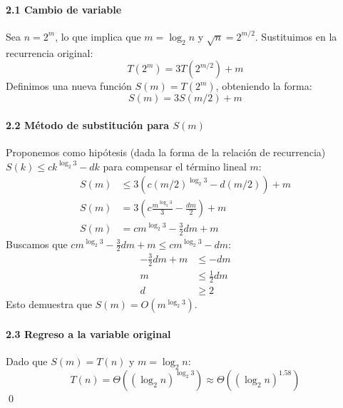 \documentclass{article}
\begin{document}
\begin{enumerate}
    \paragraph{2.1 Cambio de variable}
    Sea $n = 2^m$, lo que implica que $m = \log_2 n$ y $\sqrt{n} = 2^{m/2}$. Sustituimos en la recurrencia original:
    \[ T(2^m) = 3T(2^{m/2}) + m \]
    Definimos una nueva función $S(m) = T(2^m)$, obteniendo la forma:
    \[ S(m) = 3S(m/2) + m \]

    \paragraph{2.2 Método de substitución para $S(m)$}
    Proponemos como hipótesis (dada la forma de la relación de recurrencia) $S(k) \le ck^{\log_2 3} - dk$ para compensar el término lineal $m$:
    \begin{align*}
        S(m) &\le 3(c(m/2)^{\log_2 3} - d(m/2)) + m \\
        S(m) &= 3\left(c \frac{m^{\log_2 3}}{3} - \frac{dm}{2}\right) + m \\
        S(m) &= cm^{\log_2 3} - \frac{3}{2}dm + m
    \end{align*}
    Buscamos que $cm^{\log_2 3} - \frac{3}{2}dm + m \le cm^{\log_2 3} - dm$:
    \begin{align*}
        -\frac{3}{2}dm + m &\le -dm \\
        m &\le \frac{1}{2}dm \\
        d &\ge 2
    \end{align*}
    Esto demuestra que $S(m) = O(m^{\log_2 3})$.

    \paragraph{2.3 Regreso a la variable original}
    Dado que $S(m) = T(n)$ y $m = \log_2 n$:
    \[ T(n) = \Theta((\log_2 n)^{\log_2 3}) \approx \Theta((\log_2 n)^{1.58}) \] \qed
\end{enumerate}
\end{document}
